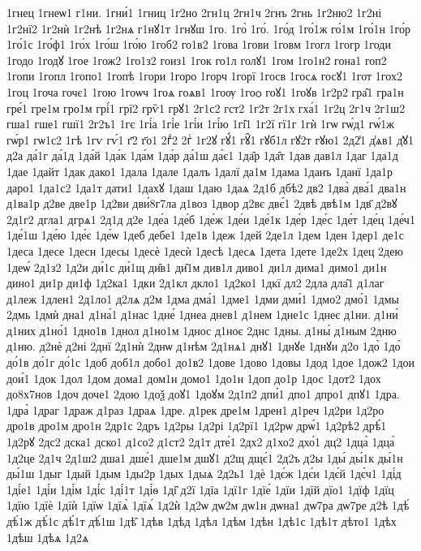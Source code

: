 {1гнец
1гнеѡ1
г1ни.
1гни́1
1гниц
1г2но
2гн1ц
2гн1ч
2гнъ
2гнь
1г2ню2
1г2ні
1г2нї2
1г2нѝ
1г2нѣ
1г2нѧ
г1нꙋ1т
1гнꙋш
1го.
1го̀
1го́.
1го́д
1го́1ж
го́1м
1го́1н
1го́р
1го́1с
1го́ф1
1го́х
1го́ш
1го́ю
1гоб2
го1в2
1гова
1гови
1говм
1гогл
1гогр
1годи
1годо
1годꙋ
1гое
1гож2
1го1з2
гоиз1
1гок
го1л
голꙋ1
1гом
1го1н2
гона1
гоп2
1гопи
1гопл
1гопо1
1гопѣ
1гори
1горо
1горч
1горї
1госв
1госѧ
госꙋ1
1гот
1гох2
1гоц
1гоча
гочє1
1гою
1гоѡч
1гоѧ
гоѧв1
1гоѹ
1гоѻ
гоꙋ1
1гоꙋв
1г2р2
гра̑1
гра1н
гре́1
гре1м
гро1м
грі́1
грї2
грѷ1
грꙋ1
2г1с2
гст2
1г2т
2г1х
гха́1
1г2ц
2г1ч
2г1ш2
гша1
гше1
гшї1
2г2ъ1
1гє
1гі́а
1гі́е
1гі́и
1гі́ю
1гі̑1
1г2ї
гї1г
1гѝ
1гѡ
гѡ́д1
гѡ́1ж
гѡ́р1
гѡ1с2
1гѣ
1гѵ
гѵ́1
г҃2
г҃о1
2гⷣ2
2гⷭ
1г2ꙋ
гꙋ́1
гꙋ̑1
гꙋб1л
гꙋ2т
гꙋю1
2д2̾1
д̾ѧв1
д̾ꙋ1
д2а
да́1г
да́1д
1да́й
1да́к
1да́м
1да́р
да́1ш
да́є1
1да̑р
1да̑т
1дав
дав1л
1даг
1да1д
1дае
1дайт
1дак
дако1
1дала
1дале
1далъ
1далї
да1м
1дама
1данъ
1данї
1да1р
даро1
1да1с2
1да1т
дати1
1дахꙋ
1даш
1даю
1даѧ
2д1б
дбѣ2
дв2
1два̀
два́1
два1н
д1ва1р
д2ве
две1р
1д2ви
дви́8г7ла
д1воз
1двор
д2вє
двє́1
2двѣ
двѣ1м
1дв҃
д2вꙋ
2д1г2
дгла1
дгрѧ1
2д1д
д2е
1де́а
1де́б
1де́ж
1де́и
1де́1к
1де́р
1де́с
1де́т
1де́ц
1де́ч1
1де́1ш
1де́ю
1де́є
1де́ѡ
1деб
дебе1
1де1в
1деж
1дей
2де1л
1дем
1ден
1дер1
де1с
1деса
1десе
1десн
1десы
1десѐ
1десѝ
1десѣ
1десѧ
1дета
1дете
1де2х
1дец
2дею
1деѡ́
2д1з2
1д2и
ди́1с
ди́1щ
ди̑в1
ди̑1м
див1л
диво1
ди1л
дима1
димо1
ди1н
дино1
ди1р
ди1ф
1д2ка1
1дки
2д1кл
дкло1
1д2ко1
1дкї
дл2
2дла
дла̑1
д1лаг
д1леж
1длен1
2д1ло1
д2лѧ
д2м
1дма
дма́1
1дме1
1дми
дми́1
1дмо2
дмо́1
1дмы
2дмь
1дмѝ
дна1
д1на́1
д1нас
1дне́
1днеа
днев1
д1нем
1дне1с
1днеє
д1ни.
д1ни́
д1них
д1но́1
1дно1в
1днол
д1но1м
1днос
д1ноє
2днс
1дны.
д1ны́
д1ным
2дню
д1ню.
д2нѐ
д2ні
2днї
2д1нѝ
2днѡ
д1нѣм
2д1нѧ1
днꙋ1
1днꙋе
1днꙋи
д2о
1до̀
1до́
до́1в
до́1г
до́1с
1доб
доб1л
добо1
до1в2
1дове
1дово
1довы
1дод
1дое
1дож2
1дои
дои́1
1док
1дол
1дом
дома1
дом1н
домо1
1до1н
1доп
до1р
1дос
1дот2
1дох
до8х7нов
1доч
доче1
2дою
1доѯ
доꙋ1
1доꙋм
2д1п2
дпи́1
дпо1
дпро1
дпꙋ1
1дра.
1дра̀
1драг
1драж
д1раз
1драѧ
1дре.
д1рек
дре1м
1дрен1
д1реч
1д2ри
1д2ро
дро1в
дро1м
дро1н
2др1с
2дръ
1д2ры
1д2рі
1д2рї1
1д2рѡ
дрѡ́1
1д2рѣ2
дрѣ́1
1д2рꙋ
2дс2
дска1
дско1
д1со2
д1ст2
2д1т
дте́1
2дх2
д1хо2
дхо́1
дц2
1дца̀
1дца́
1д2це
2д1ч
2д1ш2
дша1
дше́1
дше1м
дшꙋ1
д2щ
дщє́1
2д2ъ
д2ы
1ды́
ды́1к
ды́1н
ды́1ш
1дыг
1дый
1дым
1ды2р
1дых
1дыѧ
2д2ь1
1дѐ
1дє́ж
1дє́и
1дє́й
1дє́ч1
1ді́д
1ді́е1
1ді́и
1ді́м
1ді́с
1ді́1т
1ді́ѳ
1ді̑
д2ї
1дїа
1дї1г
1дїе́
1дїи
1дїй
дїо1
1дїф
1дїц
1дїю
1дїѐ
1дїѝ
1дїѡ
1дїѧ̀
1дїѧ́
1д2ѝ
1д2ѡ
дѡ2м
дѡ1н
дѡна1
дѡ7ра
дѡ7ре
д2ѣ
1дѣ́
дѣ́1ж
дѣ́1с
дѣ́1т
дѣ́1ш
1дѣ̑
1дѣв
1дѣд
1дѣл
1дѣм
1дѣн
1дѣ1с
1дѣ1т
дѣто1
1дѣх
1дѣш
1дѣѧ
1д2ѧ
}
